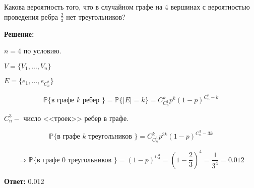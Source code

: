 \documentclass[a4paper,12pt]{article}
\newcommand{\lt}{\left}
\newcommand{\rt}{\right}
\newcommand{\fr}{\frac}
\newcommand{\bb}{\mathbb}
\newcommand{\Rw}{\Rightarrow}
\begin{document}
\section{}

Какова вероятность того, что в случайном графе на 4 вершинах с вероятностью
проведения ребра $\fr{2}{3}$ нет треугольников?

\textbf{Решение:}

\vspace{\baselineskip}

$n = 4$ по условию.

$V = \{V_1,\dots,V_n\}$

$E = \{e_1,\dots,e_{C^2_n}\}$

$$\bb P\{\text{в графе $k$ ребер }\} = \bb P\{|E| = k\} = C_{C^2_n}^k p^k(1-p)^{{C^2_n} - k}$$

$C_n^3 -$ число <<троек>> ребер в графе.

$$\bb P\{\text{в графе $k$ треугольников }\} = C_{C^3_n}^k p^{3k}(1-p)^{{C^3_n} - 3k}$$

$$\Rw \bb P\{\text{в графе $0$ треугольников }\} = (1 - p)^{C^3_4} = \lt(1 - \fr{2}{3}\rt)^4 = \fr{1}{3^4} = 0.012$$

\textbf{Ответ:} 0.012
\end{document}
